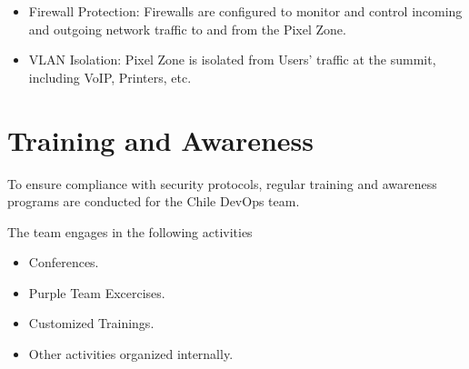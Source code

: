 \begin{itemize}
    \item Firewall Protection: Firewalls are configured to monitor and control incoming and outgoing network traffic to and from the Pixel Zone.
    \item VLAN Isolation: Pixel Zone is isolated from Users' traffic at the summit, including VoIP, Printers, etc.
\end{itemize}

\section{Training and Awareness}
To ensure compliance with security protocols, regular training and awareness programs are conducted for the Chile DevOps team. 

The team engages in the following activities

\begin{itemize}
    \item Conferences.
    \item Purple Team Excercises.
    \item Customized Trainings.
    \item Other activities organized internally.
\end{itemize}
